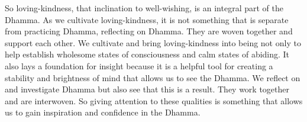So loving-kindness, that inclination to well-wishing, is an integral
part of the Dhamma. As we cultivate loving-kindness, it is not something
that is separate from practicing Dhamma, reflecting on Dhamma. They are
woven together and support each other. We cultivate and bring
loving-kindness into being not only to help establish wholesome states
of consciousness and calm states of abiding. It also lays a foundation
for insight because it is a helpful tool for creating a stability and
brightness of mind that allows us to see the Dhamma. We reflect on and
investigate Dhamma but also see that this is a result. They work
together and are interwoven. So giving attention to these qualities is
something that allows us to gain inspiration and confidence in the
Dhamma.
